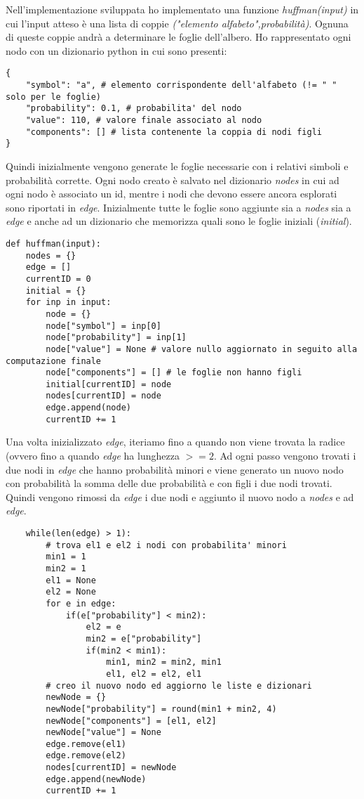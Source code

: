 \documentclass{article}
\begin{document}
Nell'implementazione sviluppata ho implementato una funzione \textit{huffman(input)} in cui l'input atteso è una lista di coppie \textit{("elemento alfabeto",probabilità)}. Ognuna di queste coppie andrà a determinare le foglie dell'albero. Ho rappresentato ogni nodo con un dizionario python in cui sono presenti:
\begin{lstlisting}
{
    "symbol": "a", # elemento corrispondente dell'alfabeto (!= " " solo per le foglie)
    "probability": 0.1, # probabilita' del nodo
    "value": 110, # valore finale associato al nodo
    "components": [] # lista contenente la coppia di nodi figli
}
\end{lstlisting}
Quindi inizialmente vengono generate le foglie necessarie con i relativi simboli e probabilità corrette. Ogni nodo creato è salvato nel dizionario \textit{nodes} in cui ad ogni nodo è associato un id, mentre i nodi che devono essere ancora esplorati sono riportati in \textit{edge}. Inizialmente tutte le foglie sono aggiunte sia a \textit{nodes} sia a \textit{edge} e anche ad un dizionario che memorizza quali sono le foglie iniziali (\textit{initial}).
\begin{lstlisting}
def huffman(input):
    nodes = {}
    edge = []
    currentID = 0
    initial = {}
    for inp in input:
        node = {}
        node["symbol"] = inp[0]
        node["probability"] = inp[1]
        node["value"] = None # valore nullo aggiornato in seguito alla computazione finale
        node["components"] = [] # le foglie non hanno figli
        initial[currentID] = node
        nodes[currentID] = node
        edge.append(node)
        currentID += 1
\end{lstlisting}
Una volta inizializzato \textit{edge}, iteriamo fino a quando non viene trovata la radice (ovvero fino a quando \textit{edge} ha lunghezza $>= 2$. Ad ogni passo vengono trovati i due nodi in \textit{edge} che hanno probabilità minori e viene generato un nuovo nodo con probabilità la somma delle due probabilità e con figli i due nodi trovati. Quindi vengono rimossi da \textit{edge} i due nodi e aggiunto il nuovo nodo a \textit{nodes} e ad \textit{edge}.
\begin{lstlisting}
    while(len(edge) > 1):
        # trova el1 e el2 i nodi con probabilita' minori
        min1 = 1
        min2 = 1
        el1 = None
        el2 = None
        for e in edge:
            if(e["probability"] < min2):
                el2 = e
                min2 = e["probability"]
                if(min2 < min1):
                    min1, min2 = min2, min1
                    el1, el2 = el2, el1
        # creo il nuovo nodo ed aggiorno le liste e dizionari
        newNode = {}
        newNode["probability"] = round(min1 + min2, 4)
        newNode["components"] = [el1, el2]
        newNode["value"] = None
        edge.remove(el1)
        edge.remove(el2)
        nodes[currentID] = newNode
        edge.append(newNode)
        currentID += 1
\end{lstlisting}
\end{document}
